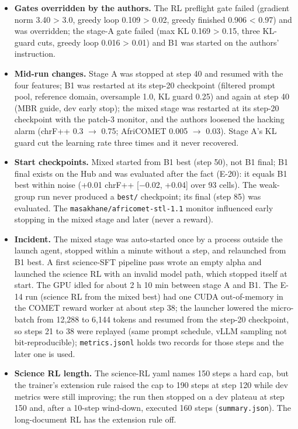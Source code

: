 \begin{itemize}
\item \textbf{Gates overridden by the authors.} The RL preflight gate failed (gradient norm 3.40 > 3.0, greedy loop 0.109 > 0.02, greedy finished 0.906 < 0.97) and was overridden; the stage-A gate failed (max KL 0.169 > 0.15, three KL-guard cuts, greedy loop 0.016 > 0.01) and B1 was started on the authors' instruction.
\item \textbf{Mid-run changes.} Stage A was stopped at step 40 and resumed with the four features; B1 was restarted at its step-20 checkpoint (filtered prompt pool, reference domain, oversample 1.0, KL guard 0.25) and again at step 40 (MBR guide, dev early stop); the mixed stage was restarted at its step-20 checkpoint with the patch-3 monitor, and the authors loosened the hacking alarm (chrF++ 0.3 $\to$ 0.75; AfriCOMET 0.005 $\to$ 0.03). Stage A's KL guard cut the learning rate three times and it never recovered.
\item \textbf{Start checkpoints.} Mixed started from B1 best (step 50), not B1 final; B1 final exists on the Hub and was evaluated after the fact (E-20): it equals B1 best within noise (+0.01 chrF++ [\ensuremath{-}0.02, +0.04] over 93 cells). The weak-group run never produced a \texttt{best/\allowbreak{}} checkpoint; its final (step 85) was evaluated. The \texttt{masakhane/\allowbreak{}africomet-\allowbreak{}stl-\allowbreak{}1.\allowbreak{}1} monitor influenced early stopping in the mixed stage and later (never a reward).
\item \textbf{Incident.} The mixed stage was auto-started once by a process outside the launch agent, stopped within a minute without a step, and relaunched from B1 best. A first science-SFT pipeline pass wrote an empty alpha and launched the science RL with an invalid model path, which stopped itself at start. The GPU idled for about 2 h 10 min between stage A and B1. The E-14 run (science RL from the mixed best) had one CUDA out-of-memory in the COMET reward worker at about step 38; the launcher lowered the micro-batch from 12,288 to 6,144 tokens and resumed from the step-20 checkpoint, so steps 21 to 38 were replayed (same prompt schedule, vLLM sampling not bit-reproducible); \texttt{metrics.\allowbreak{}jsonl} holds two records for those steps and the later one is used.
\item \textbf{Science RL length.} The science-RL yaml names 150 steps a hard cap, but the trainer's extension rule raised the cap to 190 steps at step 120 while dev metrics were still improving; the run then stopped on a dev plateau at step 150 and, after a 10-step wind-down, executed 160 steps (\texttt{summary.\allowbreak{}json}). The long-document RL has the extension rule off.

\end{itemize}
